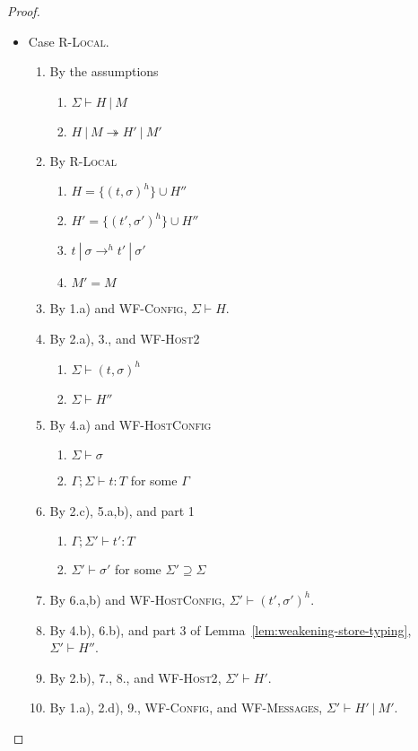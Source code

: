 \begin{proof}
\begin{itemize}
\item Case \textsc{R-Local}.
\begin{enumerate}
\item By the assumptions
  \begin{enumerate}[label=(\alph*)]
  \item $\Sigma \vdash H~|~M$
  \item $H~|~M \twoheadrightarrow H'~|~M'$
  \end{enumerate}
\item By \textsc{R-Local}
  \begin{enumerate}[label=(\alph*)]
  \item $H = \{ (t, \sigma)^h \} \cup H''$
  \item $H' = \{ (t', \sigma')^h \} \cup H''$
  \item $t~|~\sigma \rightarrow^h t'~|~\sigma'$
  \item $M' = M$
  \end{enumerate}
\item By 1.a) and \textsc{WF-Config}, $\Sigma \vdash H$.
\item By 2.a), 3., and \textsc{WF-Host2}
  \begin{enumerate}[label=(\alph*)]
  \item $\Sigma \vdash (t, \sigma)^h$
  \item $\Sigma \vdash H''$
  \end{enumerate}
\item By 4.a) and \textsc{WF-HostConfig}
  \begin{enumerate}[label=(\alph*)]
  \item $\Sigma \vdash \sigma$
  \item $\Gamma ; \Sigma \vdash t : T$ for some $\Gamma$
  \end{enumerate}
\item By 2.c), 5.a,b), and part 1
  \begin{enumerate}[label=(\alph*)]
  \item $\Gamma ; \Sigma' \vdash t' : T$
  \item $\Sigma' \vdash \sigma'$ for some $\Sigma' \supseteq \Sigma$
  \end{enumerate}
\item By 6.a,b) and \textsc{WF-HostConfig}, $\Sigma' \vdash (t', \sigma')^h$.
\item By 4.b), 6.b), and part 3 of Lemma~\ref{lem:weakening-store-typing}, $\Sigma' \vdash H''$.
\item By 2.b), 7., 8., and \textsc{WF-Host2}, $\Sigma' \vdash H'$.
\item By 1.a), 2.d), 9., \textsc{WF-Config}, and \textsc{WF-Messages}, $\Sigma' \vdash H'~|~M'$.
\end{enumerate}


\end{itemize}
\end{proof}
